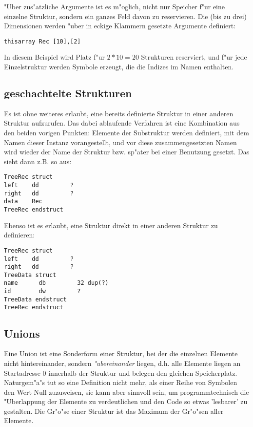 \documentclass[12pt,a4paper,twoside]{report}
\begin{document}
"Uber zus"atzliche Argumente ist es m"oglich, nicht nur Speicher f"ur eine
einzelne Struktur, sondern ein ganzes Feld davon zu reservieren.  Die (bis zu
drei) Dimensionen werden "uber in eckige Klammern gesetzte Argumente definiert:
\begin{verbatim}
thisarray Rec [10],[2]
\end{verbatim}
In diesem Beispiel wird Platz f"ur $2*10=20$ Strukturen reserviert, und f"ur
jede Einzelstruktur werden Symbole erzeugt, die die Indizes im Namen enthalten.

\subsection{geschachtelte Strukturen}

Es ist ohne weiteres erlaubt, eine bereits definierte Struktur in einer
anderen Struktur aufzurufen.  Das dabei ablaufende Verfahren ist eine
Kombination aus den beiden vorigen Punkten: Elemente der Substruktur
werden definiert, mit dem Namen dieser Instanz vorangestellt, und vor
diese zusammengesetzten Namen wird wieder der Name der Struktur bzw.
sp"ater bei einer Benutzung gesetzt.  Das sieht dann z.B. so aus:
\begin{verbatim}
TreeRec struct
left    dd         ?
right   dd         ?
data    Rec
TreeRec endstruct
\end{verbatim}

Ebenso ist es erlaubt, eine Struktur direkt in einer anderen
Struktur zu definieren:
\begin{verbatim}
TreeRec struct
left    dd         ?
right   dd         ?
TreeData struct
name      db         32 dup(?)
id        dw         ?
TreeData endstruct
TreeRec endstruct
\end{verbatim}


\subsection{Unions}

Eine Union ist eine Sonderform einer Struktur, bei der die einzelnen
Elemente nicht hintereinander, sondern {\em "ubereinander} liegen, d.h.
alle Elemente liegen an Startadresse 0 innerhalb der Struktur und belegen
den gleichen Speicherplatz.  Naturgem"a"s tut so eine Definition nicht
mehr, als einer Reihe von Symbolen den Wert Null zuzuweisen, sie kann aber
sinnvoll sein, um programmtechnisch die "Uberlappung der Elemente zu
verdeutlichen und den Code so etwas 'lesbarer' zu gestalten.  Die Gr"o"se
einer Struktur ist das Maximum der Gr"o"sen aller Elemente.
\end{document}
